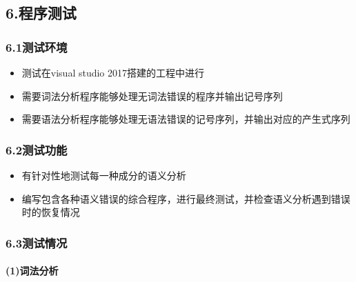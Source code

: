 \documentclass[]{ctexart}
\date{}
\let\oldparagraph\paragraph
\renewcommand{\paragraph}[1]{\oldparagraph{#1}\mbox{}}
\begin{document}
\hypertarget{header-n200}{%
\subsection{6.程序测试}\label{header-n200}}

\hypertarget{header-n202}{%
\subsubsection{6.1测试环境}\label{header-n202}}

\begin{itemize}
\item
  测试在visual studio 2017搭建的工程中进行
\item
  需要词法分析程序能够处理无词法错误的程序并输出记号序列
\item
  需要语法分析程序能够处理无语法错误的记号序列，并输出对应的产生式序列
\end{itemize}

\hypertarget{header-n210}{%
\subsubsection{6.2测试功能}\label{header-n210}}

\begin{itemize}
\item
  有针对性地测试每一种成分的语义分析
\item
  编写包含各种语义错误的综合程序，进行最终测试，并检查语义分析遇到错误时的恢复情况
\end{itemize}

\hypertarget{header-n216}{%
\subsubsection{6.3测试情况}\label{header-n216}}

\hypertarget{header-n217}{%
\paragraph{(1)词法分析}\label{header-n217}}
\end{document}

